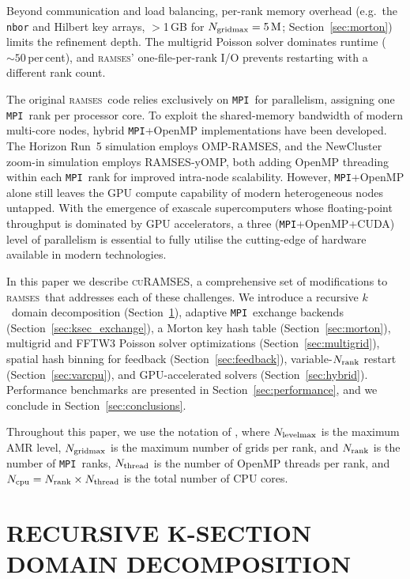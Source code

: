 \documentclass[fleqn,usenatbib]{mnras}
\newcommand{\ramses}{\textsc{ramses}}
\newcommand{\curamses}{\textsc{cuRAMSES}}
\newcommand{\ncpu}{N_{\rm cpu}}
\newcommand{\nrank}{N_{\rm rank}}
\newcommand{\nthread}{N_{\rm thread}}
\newcommand{\ngridmax}{N_{\rm gridmax}}
\newcommand{\nlevelmax}{N_{\rm levelmax}}
\newcommand{\ksec}{\ensuremath{k}\text{-section}}
\newcommand{\code}[1]{\texttt{#1}}
\newcommand{\mpi}[0]{\texttt{MPI}}
\begin{document}
Beyond communication and load balancing, per-rank memory overhead
(e.g.\ the \code{nbor} and Hilbert key arrays, $>$1\,GB for
$\ngridmax = 5\,\mathrm{M}$; Section~\ref{sec:morton}) limits the
refinement depth.  The multigrid Poisson solver \citep{Guillet2011}
dominates runtime (${\sim}50$\,per\,cent), and \ramses' one-file-per-rank
I/O prevents restarting with a different rank count.

The original \ramses\ code relies exclusively on \mpi\ for
parallelism, assigning one \mpi\ rank per processor core. To exploit the
shared-memory bandwidth of modern multi-core nodes, hybrid \mpi+OpenMP
implementations have been developed. The Horizon Run~5 simulation
\citep{Lee2021} employs OMP-RAMSES, and the NewCluster zoom-in
simulation \citep{Han2026} employs RAMSES-yOMP, both adding OpenMP
threading within each \mpi\ rank for improved intra-node scalability. However,
\mpi+OpenMP alone still leaves the GPU compute capability of modern
heterogeneous nodes untapped. With the emergence of exascale
supercomputers whose floating-point throughput is dominated by GPU
accelerators, a three (\mpi+OpenMP+CUDA) level of parallelism is essential
to fully utilise the cutting-edge of hardware available in modern technologies.

In this paper we describe \curamses, a comprehensive set of
modifications to \ramses\ that addresses each of these challenges. We
introduce a recursive \ksec\ domain decomposition
(Section~\ref{sec:ksection}), adaptive \mpi\ exchange backends
(Section~\ref{sec:ksec_exchange}), a Morton key hash table
(Section~\ref{sec:morton}), multigrid and FFTW3 Poisson solver
optimizations (Section~\ref{sec:multigrid}), spatial hash binning for
feedback (Section~\ref{sec:feedback}), variable-$\nrank$ restart
(Section~\ref{sec:varcpu}), and GPU-accelerated solvers
(Section~\ref{sec:hybrid}).  Performance benchmarks are presented in
Section~\ref{sec:performance}, and we conclude in
Section~\ref{sec:conclusions}.

Throughout this paper, we use the notation of \citet{Teyssier2002}, where
$\nlevelmax$ is the maximum AMR level, $\ngridmax$ is the maximum
number of grids per rank, and
$\nrank$ is the number of \mpi\ ranks,
$\nthread$ is the number of OpenMP threads per rank, and
$\ncpu = \nrank \times \nthread$ is the total number of CPU cores.


\section{RECURSIVE K-SECTION DOMAIN DECOMPOSITION}
\label{sec:ksection}
\end{document}
